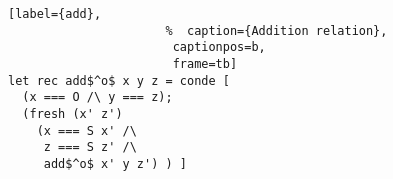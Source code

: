 \begin{figure}[!t]
  \centering
  \begin{minipage}{\columnwidth}
    \begin{lstlisting}[label={add},
                      %  caption={Addition relation},
                       captionpos=b,
                       frame=tb]
let rec add$^o$ x y z = conde [
  (x === O /\ y === z);
  (fresh (x' z')
    (x === S x' /\
     z === S z' /\
     add$^o$ x' y z') ) ]
    \end{lstlisting}
  \end{minipage}
\end{figure}